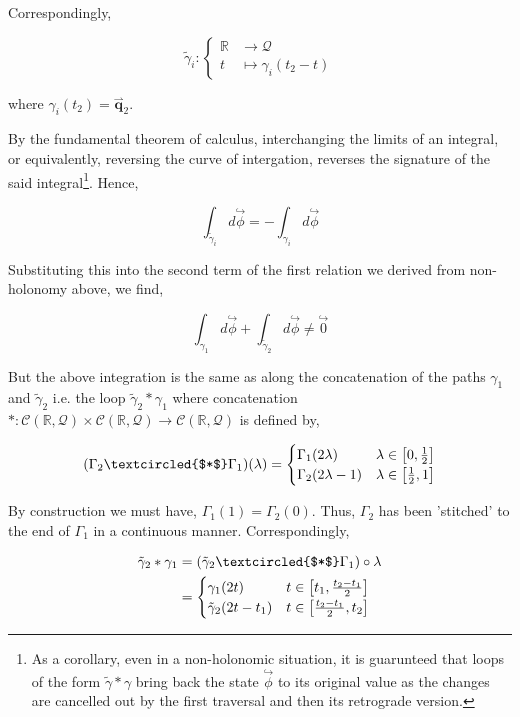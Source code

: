 \documentclass[oneside]{book}
\newcommand{\harp}{\overset{\rightharpoonup}}
\newcommand{\hook}{\overset{\hookrightarrow}}
\begin{document}
{Correspondingly,

$$\tilde{\gamma}_i : \begin{cases}
\mathbb{R} & \to \mathcal{Q} \\
t & \mapsto \gamma_i(t_2 - t)
\end{cases}$$

where $\gamma_i(t_2) = \harp{\pmb{q}}_2$. 

By the fundamental theorem of calculus, interchanging the limits of an integral, or equivalently, reversing the curve of intergation, reverses the signature of the said integral\footnote{As a corollary, even in a non-holonomic situation, it is guarunteed that loops of the form $\tilde{\gamma} * \gamma$ bring back the state $\hook{\phi}$ to its original value as the changes are cancelled out by the first traversal and then its retrograde version.}. Hence,

$$\int_{\tilde{\gamma}_i} d \hook{\phi} = - \int_{\gamma_i} d \hook{\phi}$$

Substituting this into the second term of the first relation we derived from non-holonomy above, we find,

$$\int_{\gamma_1} d \hook{\phi} + \int_{\tilde{\gamma}_2} d \hook{\phi} \neq \hook{0}$$

But the above integration is the same as along the concatenation of the paths $\gamma_1$ and $\tilde{\gamma}_2$ i.e. the loop $\tilde{\gamma}_2 * \gamma_1$ where concatenation $* : \mathcal{C}(\mathbb{R}, \mathcal{Q}) \times \mathcal{C}(\mathbb{R}, \mathcal{Q}) \to \mathcal{C}(\mathbb{R}, \mathcal{Q})$ is defined by,
\label{concatenation}

$$(\Gamma_2 \textcircled{$*$} \Gamma_1)(\lambda) = \begin{cases}
\Gamma_1(2 \lambda) & \lambda \in \left[ 0, \frac{1}{2} \right] \\
\Gamma_2(2 \lambda - 1) & \lambda \in \left[ \frac{1}{2}, 1 \right]
\end{cases}$$

By construction we must have, $\Gamma_1(1) = \Gamma_2(0)$. Thus, $\Gamma_2$ has been 'stitched' to the end of $\Gamma_1$ in a continuous manner. Correspondingly,

\begin{align*}
\tilde{\gamma}_2 * \gamma_1 & = (\tilde{\gamma}_2 \textcircled{$*$} \Gamma_1) \circ \lambda \\
& = \begin{cases}
\gamma_1(2t) & t \in \left[ t_1, \frac{t_2 - t_1}{2} \right] \\
\tilde{\gamma}_2(2t - t_1) & t \in \left[ \frac{t_2 - t_1}{2}, t_2 \right]
\end{cases}
\end{align*}

}
\end{document}
